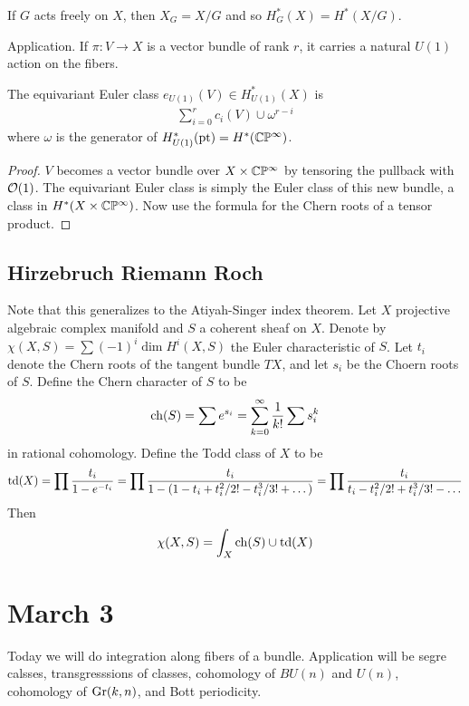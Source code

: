 \documentclass[12pt]{article}
\begin{document}
If $G$ acts freely on $X$, then $X_G = X/G$ and so $H^*_G(X) = H^*(X/G)$.

Application. If $\pi:V\to X$ is a vector bundle of rank $r$, it carries a natural $U(1)$ action on the fibers. 

\begin{proposition}
    The equivariant Euler class $e_{U(1)}(V) \in H^*_{U(1)}(X)$ is \begin{align*}
        \sum_{i=0}^r c_i(V) \cup \omega^{r-i}
    \end{align*} where $\omega$ is the generator of $H^*_{U(1)}(\mathrm{pt}) = H^*(\mathbb{C}\mathbb{P}^\infty)$.
\end{proposition}
\begin{proof}
    $V$ becomes a vector bundle over $X\times \mathbb{C}\mathbb{P}^\infty$ by tensoring the pullback with ${\mathcal{O}}(1)$. The equivariant Euler class is simply the Euler class of this new bundle, a class in $H^*(X\times \mathbb{C}\mathbb{P}^\infty)$. Now use the formula for the Chern roots of a tensor product.
\end{proof}

\subsection{Hirzebruch Riemann Roch}
Note that this generalizes to the Atiyah-Singer index theorem.
Let $X$ projective algebraic complex manifold and $S$ a coherent sheaf on $X$. Denote by $\chi(X,S) = \sum (-1)^i \dim H^i(X,S)$ the Euler characteristic of $S$. Let $t_i$ denote the Chern roots of the tangent bundle $TX$, and let $s_i$ be the Choern roots of $S$. Define the Chern character of $S$ to be \begin{align*}
    \operatorname{ch}(S) = \sum e^{s_i} = \sum_{k=0}^\infty \frac{1}{k!} \sum s_i^k
\end{align*} in rational cohomology. Define the Todd class of $X$ to be \begin{align*}
    \operatorname{td}(X) = \prod \frac{t_i}{1-e^{-t_i}} = \prod \frac{t_i}{1 - (1-t_i + t_i^2/2! - t_i^3/3! + \dots)} = \prod \frac{t_i}{t_i - t_i^2/2! + t_i^3/3! - \dots}
\end{align*} Then \begin{align*}
    \chi(X,S) = \int_X \operatorname{ch}(S) \cup \operatorname{td}(X)
\end{align*}

\section{March 3}
Today we will do integration along fibers of a bundle. Application will be segre calsses, transgresssions of classes, cohomology of $BU(n)$ and $U(n)$, cohomology of $\operatorname{Gr}(k,n)$, and Bott periodicity.
\end{document}
